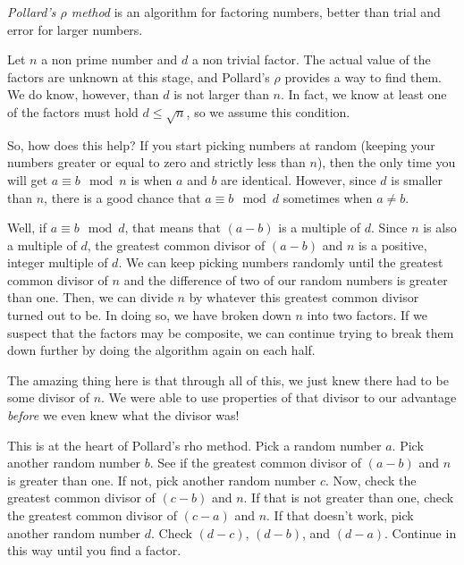 \documentclass[12pt]{article}
\begin{document}

\emph{Pollard's $\rho$ method} is an algorithm for factoring numbers, better than trial and error for larger numbers. 

Let $n$ a non prime number and $d$ a non trivial factor.  The actual value of the factors are unknown at this stage, and Pollard's $\rho$ provides a way to find them. We do know, however, than $d$ is not larger than $n$. In fact, we know at least one of the factors must hold $d\leq \sqrt{n}$, so we assume this condition. 

So, how does this help?  If you start picking numbers at random
(keeping your numbers greater or equal to zero and strictly less
than $n$), then the only time you will get $a \equiv b \mod n$ is
when $a$ and $b$ are identical.  However, since $d$ is smaller than
$n$, there is a good chance that $a \equiv b \mod d$ sometimes when
$a \neq b$.

Well, if $a \equiv b \mod d$, that means that $(a-b)$ is a multiple of
$d$.  Since $n$ is also a multiple of $d$, the greatest common
divisor of $(a-b)$ and $n$ is a positive, integer multiple of $d$.
We can keep picking numbers randomly until the greatest common
divisor of $n$ and the difference of two of our random numbers is
greater than one.  Then, we can divide $n$ by whatever this greatest
common divisor turned out to be.  In doing so, we have broken down
$n$ into two factors.  If we suspect that the factors may be
composite, we can continue trying to break them down further by
doing the algorithm again on each half.

The amazing thing here is that through all of this, we just knew
there had to be some divisor of $n$.  We were able to use properties
of that divisor to our advantage \emph{before} we even knew what the
divisor was!

This is at the heart of Pollard's rho method.  Pick a random number
$a$.  Pick another random number $b$.  See if the greatest common
divisor of $(a-b)$ and $n$ is greater than one.  If not, pick
another random number $c$.  Now, check the greatest common divisor
of $(c-b)$ and $n$.  If that is not greater than one, check the
greatest common divisor of $(c-a)$ and $n$.  If that doesn't work,
pick another random number $d$.  Check $(d-c)$, $(d-b)$, and $(d-a)$.
Continue in this way until you find a factor.
\end{document}
